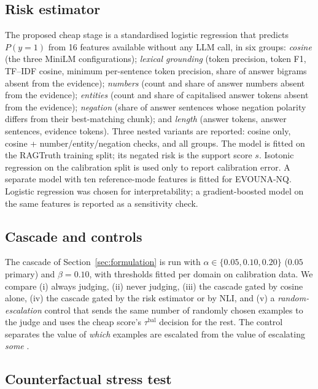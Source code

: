 \subsection{Risk estimator}
\label{sec:risk}

The proposed cheap stage is a standardised logistic regression that predicts $P(y=1)$ from 16 features available without any LLM call, in six groups: \emph{cosine} (the three MiniLM configurations); \emph{lexical grounding} (token precision, token F1, TF--IDF cosine, minimum per-sentence token precision, share of answer bigrams absent from the evidence); \emph{numbers} (count and share of answer numbers absent from the evidence); \emph{entities} (count and share of capitalised answer tokens absent from the evidence); \emph{negation} (share of answer sentences whose negation polarity differs from their best-matching chunk); and \emph{length} (answer tokens, answer sentences, evidence tokens). Three nested variants are reported: cosine only, cosine + number/entity/negation checks, and all groups. The model is fitted on the RAGTruth training split; its negated risk is the support score $s$. Isotonic regression on the calibration split is used only to report calibration error. A separate model with ten reference-mode features is fitted for EVOUNA-NQ. Logistic regression was chosen for interpretability; a gradient-boosted model on the same features is reported as a sensitivity check.

\subsection{Cascade and controls}

The cascade of Section~\ref{sec:formulation} is run with $\alpha\in\{0.05,0.10,0.20\}$ ($0.05$ primary) and $\beta=0.10$, with thresholds fitted per domain on calibration data. We compare (i) always judging, (ii) never judging, (iii) the cascade gated by cosine alone, (iv) the cascade gated by the risk estimator or by NLI, and (v) a \emph{random-escalation} control that sends the same number of randomly chosen examples to the judge and uses the cheap score's $\tau^\mathrm{bal}$ decision for the rest. The control separates the value of \emph{which} examples are escalated from the value of escalating \emph{some} \citep{dorosario2026jev}.

\subsection{Counterfactual stress test}
\label{sec:cf}

